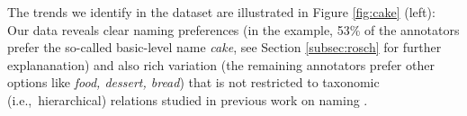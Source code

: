 The trends we identify in the dataset are illustrated in Figure \ref{fig:cake} (left): Our data reveals clear naming preferences (in the example, 53\% of the annotators prefer the so-called basic-level name \textit{cake}, see Section \ref{subsec:rosch} for further explananation) and also rich variation (the remaining annotators prefer other options like \textit{food, dessert, bread}) that is not restricted to taxonomic (i.e.,\ hierarchical) relations studied in previous work on naming \cite{Ordonez:2016,graf2016animal}.

